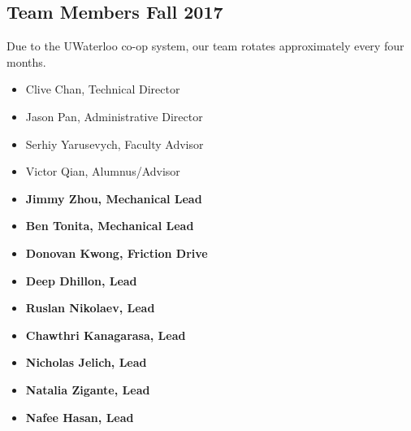 \documentclass[main.tex]{subfiles}
\begin{document}
\subsection{Team Members Fall 2017}
Due to the UWaterloo co-op system, our team rotates approximately every four months.

\begin{multicols}{2}
    \begin{itemize}[label={},noitemsep]
        \item Clive Chan, Technical Director
        \item Jason Pan, Administrative Director
    \end{itemize}
    \columnbreak
    \begin{itemize}[label={},noitemsep]
        \item Serhiy Yarusevych, Faculty Advisor
        \item Victor Qian, Alumnus/Advisor
    \end{itemize}
\end{multicols}
\begin{multicols}{3}
    \begin{itemize}[label={},noitemsep]
    \item \textbf{Jimmy Zhou, Mechanical Lead}
    \item \textbf{Ben Tonita, Mechanical Lead}
    \item \textbf{Donovan Kwong, Friction Drive}
    \end{itemize}
    \columnbreak
    \begin{itemize}[label={},noitemsep]
    \item \textbf{Deep Dhillon, Lead}
    \item \textbf{Ruslan Nikolaev, Lead}
    \end{itemize}
    \columnbreak
    \begin{itemize}[label={},noitemsep]
    \item \textbf{Chawthri Kanagarasa, Lead}
    \end{itemize}
\end{multicols}
\begin{multicols}{3}
    \begin{itemize}[label={},noitemsep]
    \item \textbf{Nicholas Jelich, Lead}
    \end{itemize}
    \columnbreak
    \begin{itemize}[label={},noitemsep]
    \item \textbf{Natalia Zigante, Lead}
    \end{itemize}
    \columnbreak
    \begin{itemize}[label={},noitemsep]
    \item \textbf{Nafee Hasan, Lead}
    \end{itemize}
\end{multicols}
\end{document}
